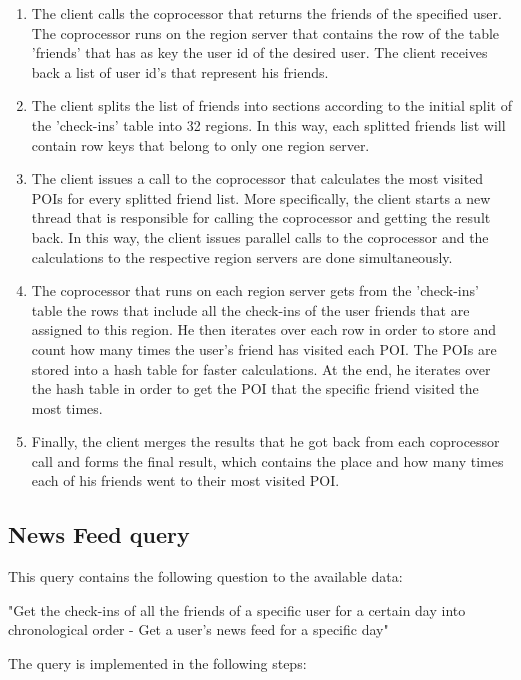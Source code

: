\begin{enumerate}
 \item The client calls the coprocessor that returns the friends of the specified user. The coprocessor runs on the region server that contains 
 the row of the table 'friends' that has as key the user id of the desired user. The client receives back a list of user id's that 
 represent his friends.
 \item The client splits the list of friends into sections according to the initial split of the 'check-ins' table into 32 regions. In this way, 
 each splitted friends list will contain row keys that belong to only one region server.
 \item The client issues a call to the coprocessor that calculates the most visited POIs for every splitted friend list. 
 More specifically, the client starts a new thread that is responsible for calling the coprocessor and getting the result back. 
 In this way, the client issues parallel calls to the coprocessor and the calculations to the respective region servers are done simultaneously.
 \item The coprocessor that runs on each region server gets from the 'check-ins' table the rows that include all the check-ins of the user friends 
 that are assigned to this region. He then iterates over each row in order to store and count how many times the user's friend has visited each POI. 
 The POIs are stored into a hash table for faster calculations. At the end, he iterates over the hash table in order to get the POI that the 
 specific friend visited the most times.
 \item Finally, the client merges the results that he got back from each coprocessor call and forms the final result, which contains the place and how many times 
 each of his friends went to their most visited POI.
\end{enumerate}

\subsection{News Feed query}

This query contains the following question to the available data:
\begin{center}
 "Get the check-ins of all the friends of a specific user for a certain day into chronological order - Get a user's news feed for a specific day"
\end{center}

The query is implemented in the following steps:

